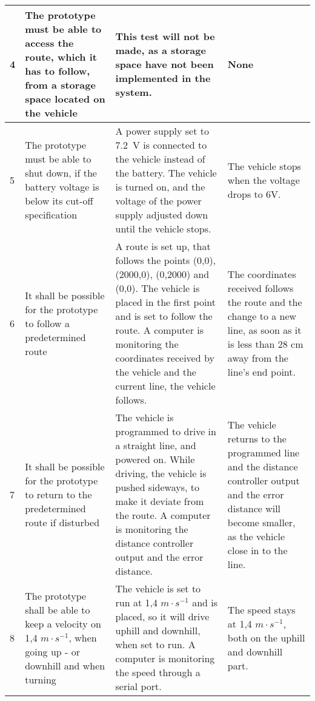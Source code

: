 \begin{table}[H]
\begin{tabular}{|p{1cm}|p{4cm}|p{7cm}|p{3cm}|}
\hline%
           4    &   The prototype must be able to access the route, which it has to follow, from a storage space located on the vehicle & This test will not be made, as a storage space have not been implemented in the system.   & None                 \\
\hline%
           5    &   The prototype must be able to shut down, if the battery voltage is below its cut-off specification &   A power supply set to \SI{7,2}{V} is connected to the vehicle instead of the battery. The vehicle is turned on, and the voltage of the power supply adjusted down until the vehicle stops.   &   The vehicle stops when the voltage drops to 6V.               \\
\hline%
           6    &   It shall be possible for the prototype to follow a predetermined route &   A route is set up, that follows the points (0,0), (2000,0), (0,2000) and (0,0). The vehicle is placed in the first point and is set to follow the route. A computer is monitoring the coordinates received by the vehicle and the current line, the vehicle follows.  &  The coordinates received follows the route and the change to a new line, as soon as it is less than 28 cm away from the line's end point. \\
\hline%
           7    &   It shall be possible for the prototype to return to the predetermined route if disturbed   &  The vehicle is programmed to drive in a straight line, and powered on. While driving, the vehicle is pushed sideways, to make it deviate from the route. A computer is monitoring the distance controller output and the error distance.    &   The vehicle returns to the programmed line and the distance controller output and the error distance will become smaller, as the vehicle close in to the line.            \\ 
\hline%
           8    &   The prototype shall be able to keep a velocity on 1,4 $m \cdot s^{-1}$, when going up - or downhill and when turning   &  The vehicle is set to run at 1,4 $m \cdot s^{-1}$ and is placed, so it will drive uphill and downhill, when set to run. A computer is monitoring the speed through a serial port.   &    The speed stays at 1,4 $m \cdot s^{-1}$, both on the uphill and downhill part.            \\
\hline%
\end{tabular}
\label{tab:AcceptTestTestProcedure}
\end{table}

